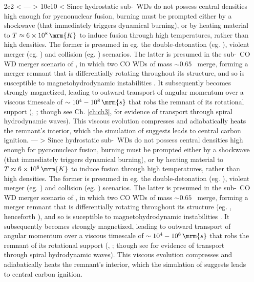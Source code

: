 2c2
< \label{sec:c5_intro}
---
> \label{sec:intro}
10c10
< Since hydrostatic sub-\Mch\ WDs do not possess central densities high enough for pycnonuclear fusion, burning must be prompted either by a shockwave (that immediately triggers dynamical burning), or by heating material to $T\approx6\times10^8\,\mrm{K}$ to induce fusion through high temperatures, rather than high densities.  The former is presumed in eg. the double-detonation (eg. \citealt{fink+07, woosk11}), violent merger (eg. \citealt{pakm+10}) and collision (eg. \citealt{loreig10}) scenarios.  The latter is presumed in the sub-\Mch\ CO WD merger scenario of \citeal{vkercj10}, in which two CO WDs of mass $\sim0.65$ \Msun\ merge, forming a merger remnant that is differentially rotating throughout its structure, and so is susceptible to magnetohydrodynamic instabilities \citep{shen+12, ji+13}.  It subsequently becomes strongly magnetized, leading to outward transport of angular momentum over a viscous timescale of $\sim10^4 - 10^8\,\mrm{s}$ that robs the remnant of its rotational support (\citeal{vkercj10}, \citealt{shen+12}; though see Ch. \ref{ch:ch3}, \citealt{kash+15} for evidence of transport through spiral hydrodynamic waves).  This viscous evolution compresses and adiabatically heats the remnant's interior, which the simulation of \cite{ji+13} suggests leads to central carbon ignition.
---
> Since hydrostatic sub-\Mch\ WDs do not possess central densities high enough for pycnonuclear fusion, burning must be prompted either by a shockwave (that immediately triggers dynamical burning), or by heating material to $T\approx6\times10^8\,\mrm{K}$ to induce fusion through high temperatures, rather than high densities.  The former is presumed in eg. the double-detonation (eg. \citealt{fink+07, woosk11}), violent merger (eg. \citealt{pakm+10}) and collision (eg. \citealt{loreig10}) scenarios.  The latter is presumed in the sub-\Mch\ CO WD merger scenario of \citeal{vkercj10}, in which two CO WDs of mass $\sim0.65$ \Msun\ merge, forming a merger remnant that is differentially rotating throughout its structure (eg. \citealt{zhu+13}, henceforth \citeal{zhu+13}), and so is suceptible to magnetohydrodynamic instabilities \citep{shen+12, ji+13}.  It subsequently becomes strongly magnetized, leading to outward transport of angular momentum over a viscous timescale of $\sim10^4 - 10^8\,\mrm{s}$ that robs the remnant of its rotational support (\citeal{vkercj10}, \citealt{shen+12}; though see \citealt{kash+15, zhu+15} for evidence of transport through spiral hydrodynamic waves).  This viscous evolution compresses and adiabatically heats the remnant's interior, which the simulation of \cite{ji+13} suggests leads to central carbon ignition.
